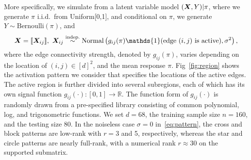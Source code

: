 \documentclass[aos]{imsart}
\theoremstyle{definition}
\begin{document}
More specifically, we simulate from a latent variable model $(\bm X,Y)|\pi$, where we generate $\pi$ i.i.d.\ from Uniform[0,1], and conditional on $\pi$, we generate $Y \sim \text{Bernoulli}(\pi)$, and 
\begin{eqnarray}\label{eq:pattern}
\mX=\entry{\mX_{ij}},\  \mX_{ij}\stackrel{\text{indep.}}{\sim} \text{Normal}\left( g_{ij}(\pi)\mathds{1}(\text{edge $(i,j)$ is active}), \sigma^2 \right), 
\end{eqnarray}
where the edge connectivity strength, denoted by $g_{ij}(\pi)$, varies depending on the location of $(i,j)\in[d]^2$, and the mean response $\pi$. Fig~\ref{fig:region} shows the activation pattern we consider that specifies the locations of the active edges. The active region is further divided into several subregions, each of which has its own signal function $g_{ij}(\cdot)\colon [0,1]\to \mathbb{R}$. The function form of $g_{ij}(\cdot)$ is randomly drawn from a pre-specified library consisting of common polynomial, log, and trigonometric functions. We set $d=68$, the training sample size $n=160$, and the testing size $80$. In the noiseless case $\sigma=0$ in~\eqref{eq:pattern}, the cross and block patterns are low-rank with $r = 3$ and 5, respectively, whereas the star and circle patterns are nearly full-rank, with a numerical rank $r \approx 30$ on the supported submatrix. 
\end{document}
